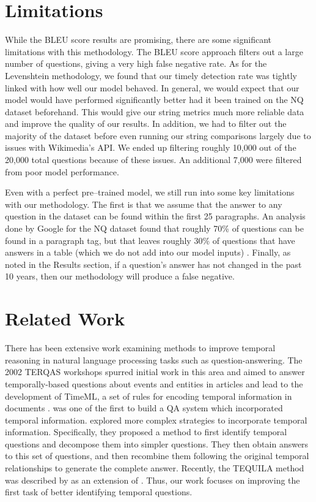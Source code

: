\documentclass{article}
\begin{document}
\section{Limitations}
While the BLEU score results are promising, there are some significant
limitations with this methodology. The BLEU score approach filters out a large
number of questions, giving a very high false negative rate. As for the
Levenshtein methodology, we found that our timely detection rate was tightly
linked with how well our model behaved. In general, we would expect that our
model would have performed significantly better had it been trained on the NQ
dataset beforehand. This would give our string metrics much more reliable data
and improve the quality of our results. In addition, we had to filter out the
majority of the dataset before even running our string comparisons largely due
to issues with Wikimedia's API. We ended up filtering roughly 10,000 out of the
20,000 total questions because of these issues. An additional 7,000 were
filtered from poor model performance.

Even with a perfect pre--trained model, we still run into some key limitations
with our methodology. The first is that we assume that the answer to any
question in the dataset can be found within the first 25 paragraphs. An analysis
done by Google for the NQ dataset found that roughly 70\% of questions can be
found in a paragraph tag, but that leaves roughly 30\% of questions that have
answers in a table (which we do not add into our model inputs) \cite{nqdataset}.
Finally, as noted in the Results section, if a question’s answer has not changed
in the past 10 years, then our methodology will produce a false negative.



\section{Related Work}

There has been extensive work examining methods to improve temporal reasoning in
natural language processing tasks such as question-answering. The 2002 TERQAS
workshops spurred initial work in this area and aimed to answer temporally-based
questions about events and entities in articles and lead to the development of
TimeML, a set of rules for encoding temporal information in documents
\cite{radev2002using}. \cite{breck2000another} was one of the first to build a
QA system which incorporated temporal information. \cite{saquete2009enhancing}
explored more complex strategies to incorporate temporal information.
Specifically, they proposed a method to first identify temporal questions and
decompose them into simpler questions. They then obtain answers to this set of
questions, and then recombine them following the original temporal relationships
to generate the complete answer. Recently, the TEQUILA method was described by
\cite{jia2018tequila} as an extension of \cite{saquete2009enhancing}. Thus, our
work focuses on improving the first task of better identifying temporal
questions.
\end{document}
